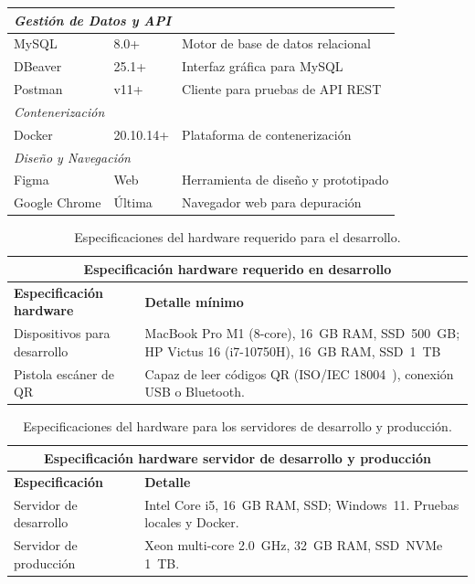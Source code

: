 \begin{longtable}{|p{}|p{}|p{}|}
    \multicolumn{3}{|l|}{\textit{Gestión de Datos y API}} \\ \hline
    MySQL & 8.0+ & Motor de base de datos relacional \\
    DBeaver & 25.1+ & Interfaz gráfica para MySQL \\
    Postman & v11+ & Cliente para pruebas de API REST \\ \hline

    \multicolumn{3}{|l|}{\textit{Contenerización}} \\ \hline
    Docker & 20.10.14+ & Plataforma de contenerización \\ \hline

    \multicolumn{3}{|l|}{\textit{Diseño y Navegación}} \\ \hline
    Figma & Web & Herramienta de diseño y prototipado \\
    Google Chrome & Última & Navegador web para depuración \\ \hline
\end{longtable}

\begin{table}[H]
    \centering
    \caption{Especificaciones del hardware requerido para el desarrollo.}
    \label{tab:hardware_desarrollo}
    \begin{tabular}{|p{}|p{}|}
    \hline
    \multicolumn{2}{|c|}{\textbf{Especificación hardware requerido en desarrollo}}\\
    \hline
    \textbf{Especificación hardware} & \textbf{Detalle mínimo} \\
    \hline
    Dispositivos para desarrollo & MacBook Pro M1 (8-core), 16~GB RAM, SSD~500~GB; HP Victus 16 (i7-10750H), 16~GB RAM, SSD~1~TB \\
    \hline
    Pistola escáner de QR & Capaz de leer códigos QR (ISO/IEC 18004~\cite{iso18004}), conexión USB o Bluetooth. \\
    \hline
    \end{tabular}
\end{table}

\begin{table}[H]
    \centering
    \caption{Especificaciones del hardware para los servidores de desarrollo y producción.}
    \label{tab:hardware_servidores}
    \begin{tabular}{|p{}|p{}|}
    \hline
    \multicolumn{2}{|c|}{\textbf{Especificación hardware servidor de desarrollo y producción}}\\
    \hline
    \textbf{Especificación} & \textbf{Detalle} \\
    \hline
    Servidor de desarrollo & Intel Core i5, 16~GB RAM, SSD; Windows~11. Pruebas locales y Docker. \\
    \hline
    Servidor de producción & Xeon multi-core 2.0~GHz, 32~GB RAM, SSD~NVMe 1~TB. \\
    \hline
    \end{tabular}
\end{table}

